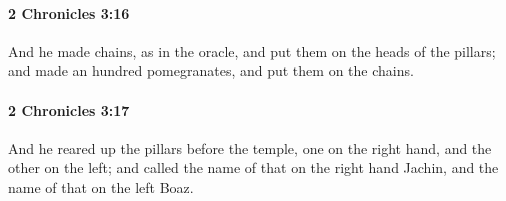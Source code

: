 		\paragraph{2 Chronicles 3:16} %
			\label{2CHRONICLES-3-16}

			And he made chains, as in the oracle, and put them on the heads of the pillars; and made an hundred pomegranates, and put them on the chains.


		\paragraph{2 Chronicles 3:17} %
			\label{2CHRONICLES-3-17}

			And he reared up the pillars before the temple, one on the right hand, and the other on the left; and called the name of that on the right hand Jachin, and the name of that on the left Boaz.

